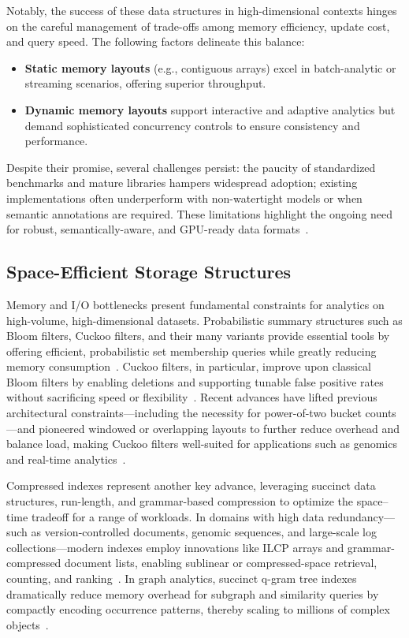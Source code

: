 \documentclass[sigconf]{acmart}
\begin{document}
Notably, the success of these data structures in high-dimensional contexts hinges on the careful management of trade-offs among memory efficiency, update cost, and query speed. The following factors delineate this balance:
\begin{itemize}
    \item \textbf{Static memory layouts} (e.g., contiguous arrays) excel in batch-analytic or streaming scenarios, offering superior throughput.
    \item \textbf{Dynamic memory layouts} support interactive and adaptive analytics but demand sophisticated concurrency controls to ensure consistency and performance.
\end{itemize}
Despite their promise, several challenges persist: the paucity of standardized benchmarks and mature libraries hampers widespread adoption; existing implementations often underperform with non-watertight models or when semantic annotations are required. These limitations highlight the ongoing need for robust, semantically-aware, and GPU-ready data formats~\cite{ref86}.

\subsection{Space-Efficient Storage Structures}

Memory and I/O bottlenecks present fundamental constraints for analytics on high-volume, high-dimensional datasets. Probabilistic summary structures such as Bloom filters, Cuckoo filters, and their many variants provide essential tools by offering efficient, probabilistic set membership queries while greatly reducing memory consumption~\cite{ref80,ref81,ref82,ref87,ref106,ref108,ref109,ref118}. Cuckoo filters, in particular, improve upon classical Bloom filters by enabling deletions and supporting tunable false positive rates without sacrificing speed or flexibility~\cite{ref81,ref82}. Recent advances have lifted previous architectural constraints—including the necessity for power-of-two bucket counts—and pioneered windowed or overlapping layouts to further reduce overhead and balance load, making Cuckoo filters well-suited for applications such as genomics and real-time analytics~\cite{ref81}.

\vspace{3mm}

Compressed indexes represent another key advance, leveraging succinct data structures, run-length, and grammar-based compression to optimize the space--time tradeoff for a range of workloads. In domains with high data redundancy—such as version-controlled documents, genomic sequences, and large-scale log collections—modern indexes employ innovations like ILCP arrays and grammar-compressed document lists, enabling sublinear or compressed-space retrieval, counting, and ranking~\cite{ref87,ref106,ref108}. In graph analytics, succinct q-gram tree indexes dramatically reduce memory overhead for subgraph and similarity queries by compactly encoding occurrence patterns, thereby scaling to millions of complex objects~\cite{ref109}.
\end{document}

